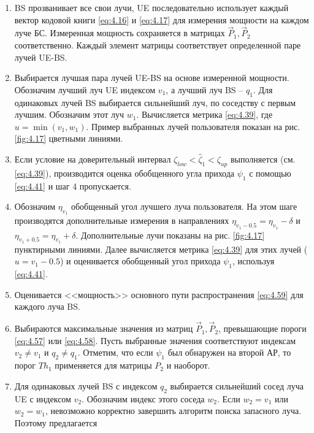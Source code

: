 \begin{enumerate}[label=\textbf{Шаг \arabic*:}]
    \item BS прозванивает все свои лучи, UE последовательно использует
          каждый вектор кодовой книги \eqref{eq:4.16} и \eqref{eq:4.17} для
          измерения мощности на каждом луче БС. Измеренная мощность сохраняется
          в матрицах $\vec P_1, \vec P_2$ соответственно. Каждый элемент матрицы соответствует
          определенной паре лучей UE-BS.
    \item Выбирается лучшая пара лучей UE-BS на основе измеренной мощности.
          Обозначим лучший луч UE индексом $v_1$, а лучший луч BS -- $q_1$.
          Для одинаковых лучей BS выбирается сильнейший луч, по соседству с первым лучшим.
          Обозначим этот луч $w_1$. Вычисляется метрика \eqref{eq:4.39}, где $u=\min(v_1,w_1)$.
          Пример выбранных лучей пользователя показан на рис. \ref{fig:4.17} цветными линиями.
    \item Если условие на доверительный интервал $\zeta_{low} < \hat \zeta_1 < \zeta_{up}$
          выполняется (см. \eqref{eq:4.39}), производится оценка обобщенного угла прихода
          $\psi_1$ с помощью \eqref{eq:4.41} и шаг 4 пропускается.
    \item Обозначим $\eta_{v_1}$ обобщенный угол лучшего луча пользователя.
          На этом шаге производятся дополнительные измерения в направлениях
          $\eta_{v_1 - 0.5} = \eta_{v_1} - \delta$ и
          $\eta_{v_1 + 0.5} = \eta_{v_1} + \delta$. Дополнительные лучи
          показаны на рис. \ref{fig:4.17} пунктирными линиями. Далее вычисляется
          метрика \eqref{eq:4.39} для этих лучей ($u=v_1 - 0.5$) и оценивается
          обобщенный угол прихода $\psi_1$, используя \eqref{eq:4.41}.
    \item Оценивается <<мощность>> основного пути распространения \eqref{eq:4.59} для каждого луча BS.
    \item Выбираются максимальные значения из матриц $\vec P_1, \vec P_2$,
          превышающие пороги \eqref{eq:4.57} или \eqref{eq:4.58}. Пусть выбранные значения соответствуют
          индексам $v_2\neq v_1$ и $q_2 \neq q_1$.  Отметим, что если $\psi_1$ был
          обнаружен на второй АР, то порог $Th_1$ применяется для матрицы $P_2$ и наоборот.
    \item Для одинаковых лучей BS с индексом $q_2$ выбирается сильнейший сосед луча UE
          с индексом $v_2$. Обозначим индекс этого соседа $w_2$. Если $w_2 = v_1$ или $w_2=w_1$,
          невозможно корректно завершить алгоритм поиска запасного луча. Поэтому предлагается

\end{enumerate}
